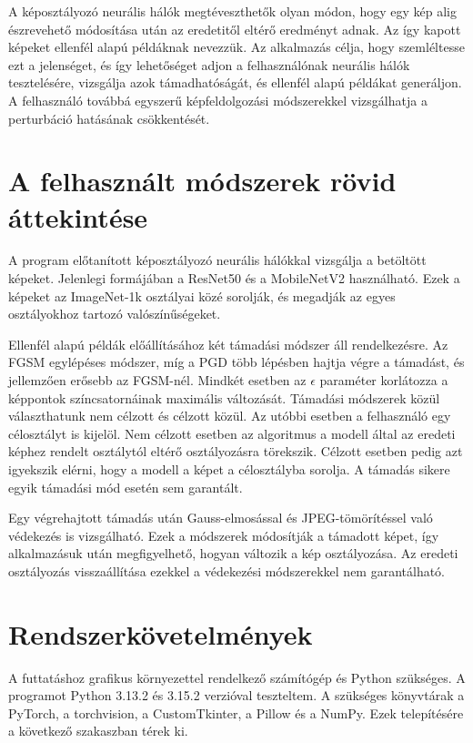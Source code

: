 A képosztályozó neurális hálók megtéveszthetők olyan módon, hogy egy kép alig észrevehető módosítása után az eredetitől eltérő 
eredményt adnak. 
Az így kapott képeket ellenfél alapú példáknak nevezzük. 
Az alkalmazás célja, hogy szemléltesse ezt a jelenséget, és így lehetőséget adjon a felhasználónak neurális hálók tesztelésére, 
vizsgálja azok támadhatóságát, és ellenfél alapú példákat generáljon. 
A felhasználó továbbá egyszerű képfeldolgozási módszerekkel vizsgálhatja a perturbáció 
hatásának csökkentését. 

\section{A felhasznált módszerek rövid áttekintése}
A program előtanított képosztályozó neurális hálókkal vizsgálja a betöltött képeket. 
Jelenlegi formájában a ResNet50 és a MobileNetV2 használható. 
Ezek a képeket az ImageNet-1k osztályai közé sorolják, és megadják az egyes osztályokhoz tartozó valószínűségeket. 

Ellenfél alapú példák előállításához két támadási módszer áll rendelkezésre. 
Az FGSM egylépéses módszer, míg a PGD több lépésben hajtja végre a támadást, és jellemzően erősebb az FGSM-nél. 
Mindkét esetben az $\epsilon$ paraméter korlátozza a képpontok színcsatornáinak maximális változását. 
Támadási módszerek közül választhatunk nem célzott és célzott közül. 
Az utóbbi esetben a felhasználó egy célosztályt is kijelöl. 
Nem célzott esetben az algoritmus a modell által az eredeti képhez rendelt osztálytól eltérő osztályozásra törekszik. 
Célzott esetben pedig azt igyekszik elérni, hogy a modell a képet a célosztályba sorolja. 
A támadás sikere egyik támadási mód esetén sem garantált. 

Egy végrehajtott támadás után Gauss-elmosással és JPEG-tömörítéssel való védekezés is vizsgálható. 
Ezek a módszerek módosítják a támadott képet, így alkalmazásuk után megfigyelhető, hogyan változik a kép osztályozása. 
Az eredeti osztályozás visszaállítása ezekkel a védekezési módszerekkel nem garantálható. 

\section{Rendszerkövetelmények}
A futtatáshoz grafikus környezettel rendelkező számítógép és Python szükséges. 
A programot Python 3.13.2 és 3.15.2 verzióval teszteltem. 
A szükséges könyvtárak a PyTorch, a torchvision, a CustomTkinter, a Pillow és a NumPy. 
Ezek telepítésére a következő szakaszban térek ki. 

